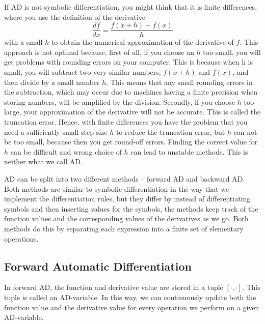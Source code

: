 If AD is not symbolic differentiation, you might think that it is finite differences, where you use the definition of the derivative
\begin{equation*}
    \frac{df}{dx} = \frac{f(x+h) - f(x)}{h}
\end{equation*}
with a small $h$ to obtain the numerical approximation of the derivative of $f$. This approach is not optimal because, first of all, if you choose an $h$ too small, you will get problems with rounding errors on your computer. This is because when h is small, you will subtract two very similar numbers, $f(x+h)$ and $f(x)$, and then divide by a small number $h$. This means that any small rounding errors in the subtraction, which may occur due to machines having a finite precision when storing numbers, will be amplified by the division. Secondly, if you choose $h$ too large, your approximation of the derivative will not be accurate. This is called the truncation error. Hence, with finite differences you have the problem that you need a sufficiently small step size $h$ to reduce the truncation error, but $h$ can not be too small, because then you get round-off errors. Finding the correct value for $h$ can be difficult and wrong choice of $h$ can lead to unstable methods. This is neither what we call AD.

AD can be split into two different methods -- forward AD and backward AD. Both methods are similar to symbolic differentiation in the way that we implement the differentiation rules, but they differ by instead of differentiating symbols and then inserting values for the symbols, the methods keep track of the function values and the corresponding values of the derivatives as we go. Both methods do this by separating each expression into a finite set of elementary operations. 

\subsection{Forward Automatic Differentiation}
In forward AD, the function and derivative value are stored in a tuple $[\cdot, \cdot]$. This tuple is called an AD-variable. In this way, we can continuously update both the function value and the derivative value for every operation we perform on a given AD-variable. 

